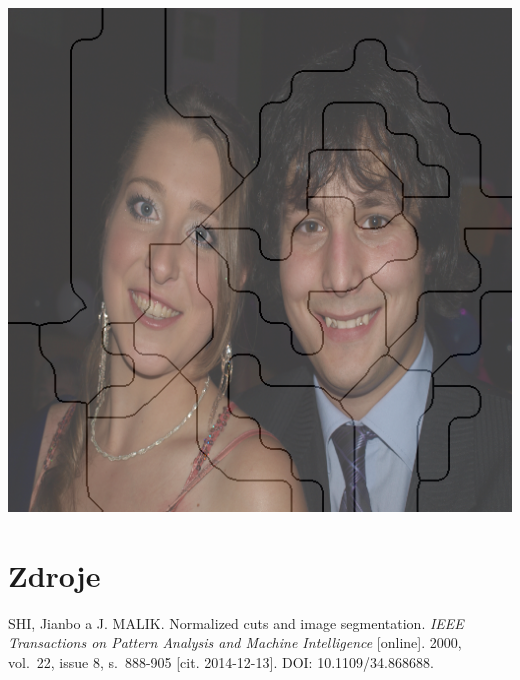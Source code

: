 \documentclass[11pt]{beamer}
\begin{document}
\begin{frame}
\begin{center}
\includegraphics[scale=0.40]{images/emb1_2_2.png}
\end{center}
\end{frame}


\section*{Zdroje}
\begin{frame}
\begin{thebibliography}{9}
SHI, Jianbo a J. MALIK. Normalized cuts and image segmentation. \textit{IEEE Transactions on Pattern Analysis and Machine Intelligence} [online]. 2000, vol.~22, issue 8, s.~888-905 [cit. 2014-12-13]. DOI: 10.1109/34.868688. 
\end{thebibliography}
\end{frame}
\end{document}
